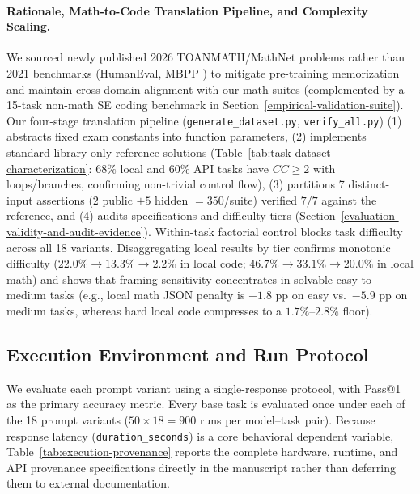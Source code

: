 \documentclass[a4paper,fleqn]{cas-sc}
\begin{document}
\paragraph{Rationale, Math-to-Code Translation Pipeline, and Complexity Scaling.}
We sourced newly published 2026 TOANMATH/MathNet problems rather than 2021 benchmarks (HumanEval, MBPP \citep{chen2021codex, austin2021mbpp}) to mitigate pre-training memorization and maintain cross-domain alignment with our math suites (complemented by a 15-task non-math SE coding benchmark in Section~\ref{empirical-validation-suite}). Our four-stage translation pipeline (\texttt{generate\_dataset.py}, \texttt{verify\_all.py}) (1) abstracts fixed exam constants into function parameters, (2) implements standard-library-only reference solutions (Table~\ref{tab:task-dataset-characterization}: $68\%$ local and $60\%$ API tasks have $CC \ge 2$ with loops/branches, confirming non-trivial control flow), (3) partitions 7 distinct-input assertions ($2$ public $+ 5$ hidden $= 350$/suite) verified $7/7$ against the reference, and (4) audits specifications and difficulty tiers (Section~\ref{evaluation-validity-and-audit-evidence}). Within-task factorial control blocks task difficulty across all 18 variants. Disaggregating local results by tier confirms monotonic difficulty ($22.0\% \to 13.3\% \to 2.2\%$ in local code; $46.7\% \to 33.1\% \to 20.0\%$ in local math) and shows that framing sensitivity concentrates in solvable easy-to-medium tasks (e.g., local math JSON penalty is $-1.8$ pp on easy vs.\ $-5.9$ pp on medium tasks, whereas hard local code compresses to a $1.7\%$--$2.8\%$ floor).

\subsection{Execution Environment and Run Protocol}\label{execution-environment-and-run-protocol}

We evaluate each prompt variant using a single-response protocol, with Pass@1 as the primary accuracy metric. Every base task is evaluated once under each of the 18 prompt variants ($50 \times 18 = 900$ runs per model--task pair). Because response latency (\texttt{duration\_seconds}) is a core behavioral dependent variable, Table~\ref{tab:execution-provenance} reports the complete hardware, runtime, and API provenance specifications directly in the manuscript rather than deferring them to external documentation.
\end{document}
